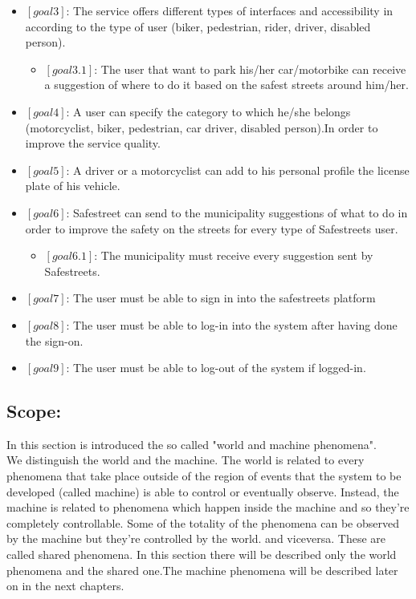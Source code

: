 \documentclass[titlepage]{article}
\begin{document}
\begin{itemize}
\begin{itemize}
      \end{itemize}
\item $[goal 3]$: The service offers different types of 						  interfaces and accessibility in according 					  to the type of user (biker, pedestrian, 						  rider, driver, disabled person).
	\begin{itemize}
	\item $[goal 3.1]$: The user that want to park his/her  							car/motorbike can receive a                           						suggestion of where to do it 
						based on the safest streets around 								him/her.\\
	\end{itemize}


\item $[goal 4]$: A user can specify the category to which 						  he/she belongs (motorcyclist, biker, 							  pedestrian, car driver, disabled person).In 				  order to improve the service quality.\\

\item $[goal 5]$: A driver or a motorcyclist can add to his 					  personal profile the license plate of his 					  vehicle.\\

\item $[goal 6]$: Safestreet can send to the municipality 						  suggestions of what to do in order to 						  improve the safety on the streets for every 
				  type of Safestreets user.
	\begin{itemize}
	\item $[goal 6.1]$: The municipality must receive every 
					    suggestion sent by Safestreets.\\
					   
	
	\end{itemize}
\item $[goal 7]$: The user must be able to sign in into the safestreets platform
\item $[goal 8]$: The user must be able to log-in into the system after having done the sign-on.
\item $[goal 9]$: The user must be able to log-out of the system if logged-in.
\end{itemize}

\subsection{Scope:}
In this section is introduced the so called "world and machine phenomena".\\
We distinguish the world and the machine. The world is related to every phenomena that take place outside of the region of events that the system to be developed (called machine) is able to control or eventually observe. Instead, the machine is related to phenomena which happen inside the machine and so they're completely controllable. Some of the totality of the phenomena can be observed by the machine but they're controlled by the world.  and viceversa. These are called shared phenomena. In this section there will be described only the world phenomena and the shared one.The machine phenomena will be described later on in the next chapters.
\end{document}
